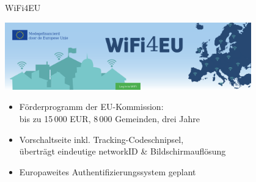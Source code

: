 \documentclass[t,aspectratio=169]{beamer}
\begin{document}
  
  \begin{frame}{WiFi4EU}
  \vspace{-1.5em}
  \begin{center}
    \includegraphics[width=0.8\textwidth]{Bilder/wifi4eu}
  \end{center}
  \begin{itemize}
   \item Förderprogramm der EU-Kommission:\\bis zu 15\,000 EUR, 8\,000 Gemeinden, drei Jahre
   \item Vorschaltseite inkl. Tracking-Codeschnipsel,\\
         überträgt eindeutige networkID \& Bildschirmauflösung
   \item Europaweites Authentifizierungssystem geplant
  \end{itemize}

% 


\end{frame}
\end{document}
